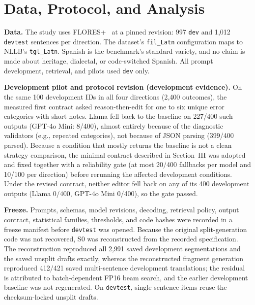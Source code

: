 \section{Data, Protocol, and Analysis}
\textbf{Data.} The study uses FLORES+~\cite{nllb2022,floresplus} at a pinned revision: 997 \texttt{dev} and 1{,}012 \texttt{devtest} sentences per direction. The dataset's \texttt{fil\_Latn} configuration maps to NLLB's \texttt{tgl\_Latn}. Spanish is the benchmark's standard variety, and no claim is made about heritage, dialectal, or code-switched Spanish. All prompt development, retrieval, and pilots used \texttt{dev} only.

\textbf{Development pilot and protocol revision (development evidence).} On the same 100 development IDs in all four directions (2{,}400 outcomes), the measured first contract asked reason-then-edit for one to six unique error categories with short notes. Llama fell back to the baseline on 227/400 such outputs (GPT-4o Mini: 8/400), almost entirely because of the diagnostic validators (e.g., repeated categories), not because of JSON parsing (399/400 parsed). Because a condition that mostly returns the baseline is not a clean strategy comparison, the minimal contract described in Section~III was adopted and fixed together with a reliability gate (at most 20/400 fallbacks per model and 10/100 per direction) before rerunning the affected development conditions. Under the revised contract, neither editor fell back on any of its 400 development outputs (Llama 0/400, GPT-4o Mini 0/400), so the gate passed.

\textbf{Freeze.} Prompts, schemas, model revisions, decoding, retrieval policy, output contract, statistical families, thresholds, and code hashes were recorded in a freeze manifest before \texttt{devtest} was opened. Because the original split-generation code was not recovered, S0 was reconstructed from the recorded specification. The reconstruction reproduced all 2{,}991 saved development segmentations and the saved unsplit drafts exactly, whereas the reconstructed fragment generation reproduced 412/421 saved multi-sentence development translations; the residual is attributed to batch-dependent FP16 beam search, and the earlier development baseline was not regenerated. On \texttt{devtest}, single-sentence items reuse the checksum-locked unsplit drafts.

